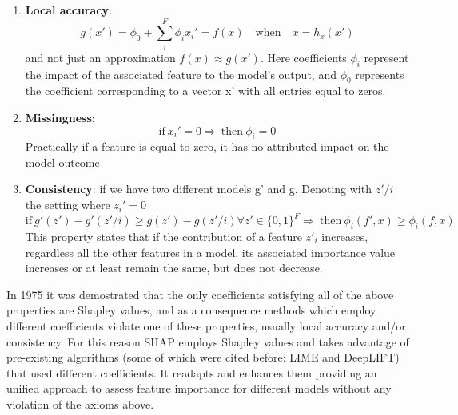 \documentclass[11pt]{report}
\begin{document}
\begin{enumerate}
\item \textbf{Local accuracy}:
\begin{equation}
g(x') =\phi_0 + \sum_i^F \phi_i x_i' \mathbf{=} f(x) \quad \text{when} \quad x = h_x(x')
\end{equation} and not just an approximation $f(x) \approx g(x')$. Here coefficients $\phi_i$ represent the impact of the associated feature to the model's output, and $\phi_0$ represents the coefficient corresponding to a vector x' with all entries equal to zeros.
\item \textbf{Missingness}:
\begin{equation}
\text{if} \ x_i' = 0 \Longrightarrow \ \text{then} \ \phi_i = 0
\end{equation}
Practically if a feature is equal to zero, it has no attributed impact on the model outcome
\item \textbf{Consistency}: if we have two different models g' and g. Denoting with $z' / i$ the setting where $z_i' = 0$
\begin{equation}
\text{if} \ g'(z') - g'(z' / i) \ge g(z') - g(z' / i) \forall z' \in \{0, 1\}^F \Longrightarrow \ \text{then} \ \phi_i(f', x) \ge \phi_i(f, x)
\end{equation}
This property states that if the contribution of a feature $z'_i$ increases, regardless all the other features in a model, its associated importance value increases or at least remain the same, but does not decrease.
\end{enumerate}

In 1975 it was demostrated \cite{young1985} that the only coefficients satisfying all of the above properties are Shapley values, and as a consequence methods which employ different coefficients violate one of these properties, usually local accuracy and/or consistency.
For this reason SHAP employs Shapley values and takes advantage of pre-existing algorithms (some of which were cited before: LIME and DeepLIFT) that used different coefficients. It readapts and enhances them providing an unified approach to assess feature importance for different models without any violation of the axioms above.
\end{document}
